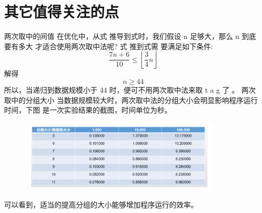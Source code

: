 \section{其它值得关注的点}
两次取中的间值
在优化中，从式 推导到式时，我们假设  n  足够大，那么  n  到底要有多大 才适合使用两次取中法呢?
式 推到式需 要满足如下条件:
$$
\frac{7 n+6}{10} \leq\left\lfloor\frac{3}{4} n\right\rfloor
$$
解得
$$
n \geq 44
$$
所以，当递归到数据规模小于 44 时，便可不用两次取中法来取  t a g 了 。 
两次取中的分组大小
当数据规模较大时，两次取中法的分组大小会明显影响程序运行时间，下图 是一次实验结果的截图，时间单位为秒。
\begin{figure}[h]
	\begin{minipage}[t]{1\linewidth}
		\centering
		\includegraphics[width=10cm,height=3.5cm]{image/kth3.png}
	\end{minipage}
\end{figure}
可以看到，适当的提高分组的大小能够增加程序运行的效率。


